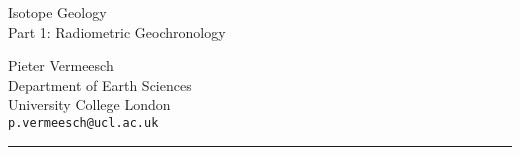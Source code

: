 \documentclass{report}
\begin{document}
\begin{titlepage}
  
  \parbox[t]{0.93\textwidth}{
    \parbox[t]{0.91\textwidth}{
      \raggedleft
      \fontsize{50pt}{80pt}
      \vspace{0.7cm}
      \Huge
      Isotope Geology \\
      \Large
      Part 1: Radiometric Geochronology\\
    }
  }

\vfill
  
  \parbox[t]{0.93\textwidth}{
    \raggedleft
    \large
        {\Large Pieter Vermeesch}\\[4pt]
        Department of Earth Sciences\\
        University College London\\[4pt]
        \texttt{p.vermeesch@ucl.ac.uk}\\
	
        \hfill\rule{0.2\linewidth}{1pt}
}
	
\end{titlepage}

\tableofcontents





































\newpage\pagestyle{empty}~
\end{document}
